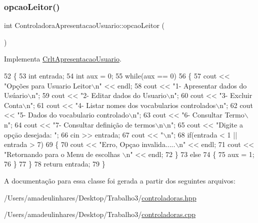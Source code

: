 \subsubsection{\texorpdfstring{opcao\+Leitor()}{opcaoLeitor()}}
{\footnotesize\ttfamily int Controladora\+Apresentacao\+Usuario\+::opcao\+Leitor (\begin{DoxyParamCaption}{ }\end{DoxyParamCaption})\hspace{0.3cm}{\ttfamily [virtual]}}



Implementa \mbox{\hyperlink{class_crlt_apresentacao_usuario_a627dcf5329233dee6ef2888dacf8a5a1}{Crlt\+Apresentacao\+Usuario}}.


\begin{DoxyCode}
52 \{
53   \textcolor{keywordtype}{int} entrada;
54   \textcolor{keywordtype}{int} aux = 0;
55   \textcolor{keywordflow}{while}(aux == 0)
56   \{
57       cout << \textcolor{stringliteral}{"Opções para Usuario Leitor\(\backslash\)n"} << endl;
58       cout << \textcolor{stringliteral}{"1- Apresentar dados do Usúario\(\backslash\)n"};
59       cout << \textcolor{stringliteral}{"2- Editar dados do Usuario\(\backslash\)n"};
60       cout << \textcolor{stringliteral}{"3- Excluir Conta\(\backslash\)n"};
61       cout << \textcolor{stringliteral}{"4- Listar nomes dos vocabularios controlados\(\backslash\)n"};
62       cout << \textcolor{stringliteral}{"5- Dados do vocabulario controlado\(\backslash\)n"};
63       cout << \textcolor{stringliteral}{"6- Consultar Termo\(\backslash\)n"};
64       cout << \textcolor{stringliteral}{"7- Consultar definição de termos\(\backslash\)n\(\backslash\)n"};
65       cout << \textcolor{stringliteral}{"Digite a opçāo desejada: "};
66       cin >> entrada;
67       cout << \textcolor{stringliteral}{"\(\backslash\)n"};
68       \textcolor{keywordflow}{if}(entrada < 1 || entrada > 7)
69       \{
70         cout << \textcolor{stringliteral}{"Erro, Opçao invalida.....\(\backslash\)n"} << endl;
71         cout << \textcolor{stringliteral}{"Retornando para o Menu de escolhas \(\backslash\)n"} << endl;
72       \}
73       \textcolor{keywordflow}{else}
74       \{
75         aux = 1;
76       \}
77   \}
78   \textcolor{keywordflow}{return} entrada;
79 \}
\end{DoxyCode}


A documentação para essa classe foi gerada a partir dos seguintes arquivos\+:\begin{DoxyCompactItemize}
\item 
/\+Users/amadeulinhares/\+Desktop/\+Trabalho3/\mbox{\hyperlink{controladoras_8hpp}{controladoras.\+hpp}}\item 
/\+Users/amadeulinhares/\+Desktop/\+Trabalho3/\mbox{\hyperlink{controladoras_8cpp}{controladoras.\+cpp}}\end{DoxyCompactItemize}
